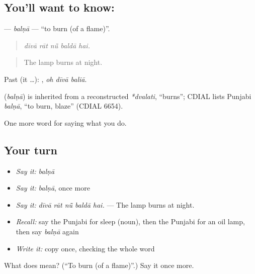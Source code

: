 \subsection*{You'll want to know: }
\textbf{} — \emph{balṇā} — \textquotedblleft{}to burn (of a flame)\textquotedblright{}.

\begin{quote}
    
\end{quote}

\begin{quote}
\emph{dīvā rāt nū̃ baldā hai.}
\end{quote}

\begin{quote}
The lamp burns at night.
\end{quote}

Past (it …):   , \emph{oh dīvā baliā}.

\begin{cousinweb}
\textbf{} (\emph{balṇā}) is inherited from a reconstructed \emph{*dvalati}, \textquotedblleft{}burns\textquotedblright{}; CDIAL lists Punjabi \emph{balṇā}, \textquotedblleft{}to burn, blaze\textquotedblright{} (CDIAL 6654).
\end{cousinweb}

\begin{grammarlens}[title={What you've built}]
One more word for saying what you do.
\end{grammarlens}

\subsection*{Your turn}
\begin{itemize}
\raggedright
  \item \emph{Say it:} \emph{balṇā}
  \item \emph{Say it:} \emph{balṇā}, once more
  \item \emph{Say it:} \emph{dīvā rāt nū̃ baldā hai.} — The lamp burns at night.
  \item \emph{Recall:} say the Punjabi for sleep (noun), then the Punjabi for an oil lamp, then say \emph{balṇā} again
  \item \emph{Write it:} copy \textbf{} once, checking the whole word
\end{itemize}

\begin{tcolorbox}[breakable,colback=teal!4,colframe=teal!35!black,title={Before you move on}]
What does  mean? (\textquotedblleft{}To burn (of a flame)\textquotedblright{}.) Say it once more.
\end{tcolorbox}

